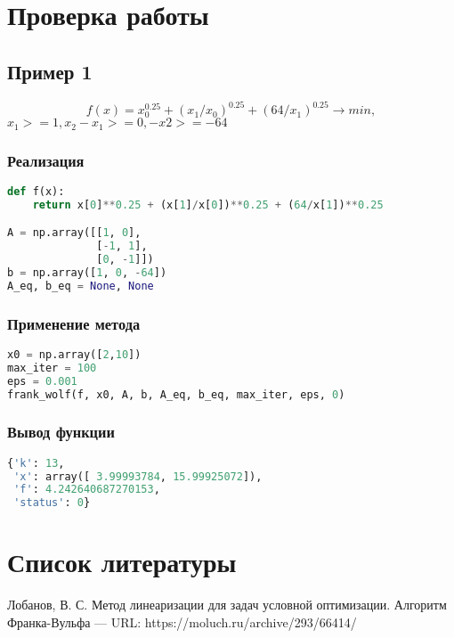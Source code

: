 \documentclass{article}
\begin{document}
\newpage
\section{Проверка работы}

\subsection{Пример 1}
$$f(x) = x_0^0.25 + (x_1/x_0)^0.25 + (64/x_1)^0.25 \rightarrow min,$$
$ x_1 >= 1, x_2-x_1>=0, -x2 >= -64$

\subsubsection{Реализация}
\begin{lstlisting}[language=Python]
def f(x):
    return x[0]**0.25 + (x[1]/x[0])**0.25 + (64/x[1])**0.25

A = np.array([[1, 0],
              [-1, 1],
              [0, -1]])
b = np.array([1, 0, -64])
A_eq, b_eq = None, None
\end{lstlisting}

\subsubsection{Применение метода}

\begin{lstlisting}[language=Python]
x0 = np.array([2,10])
max_iter = 100
eps = 0.001
frank_wolf(f, x0, A, b, A_eq, b_eq, max_iter, eps, 0)
\end{lstlisting}


\subsubsection{Вывод функции}

\begin{lstlisting}[language=Python]
{'k': 13,
 'x': array([ 3.99993784, 15.99925072]),
 'f': 4.242640687270153,
 'status': 0}
\end{lstlisting}

\newpage
\section{Список литературы}

Лобанов, В. С. Метод линеаризации для задач условной оптимизации. Алгоритм Франка-Вульфа — URL: https://moluch.ru/archive/293/66414/
 
\end{document}
